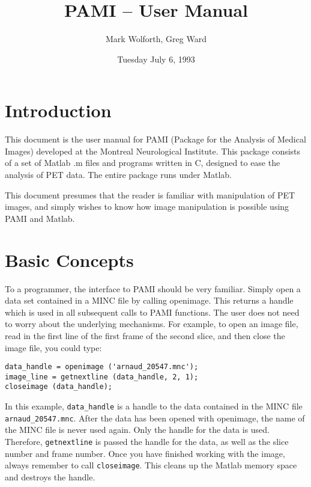 
\title{PAMI -- User Manual}
\author{Mark Wolforth, Greg Ward}
\date{Tuesday July 6, 1993}  

\def\code#1{{\tt #1}}

 

\maketitle
\newpage

\tableofcontents

\newpage
\section{Introduction}

This document is the user manual for PAMI (Package for the Analysis of Medical
Images) developed at the Montreal Neurological Institute.  This package consists
of a set of Matlab .m files and programs written in C, designed to ease the
analysis of PET data.  The entire package runs under Matlab.

This document presumes that the reader is familiar with manipulation of PET
images, and simply wishes to know how image manipulation is possible using
PAMI and Matlab.


\newpage
\section{Basic Concepts}

To a programmer, the interface to PAMI should be very familiar.  Simply open
a data set contained in a MINC file by calling openimage.  This returns a
handle which is used in all subsequent calls to PAMI functions.  The user does
not need to worry about the underlying mechanisms.  For example, to open
an image file, read in the first line of the first frame of the second slice,
and then close the image file, you could type:


\begin{verbatim}
data_handle = openimage ('arnaud_20547.mnc');
image_line = getnextline (data_handle, 2, 1);
closeimage (data_handle);
\end{verbatim}


In this example, \verb+data_handle+ is a handle to the data contained in the
MINC file \verb+arnaud_20547.mnc+.  After the data has been opened with
openimage, the name of the MINC file is never used again.  Only the handle for
the data is used.  Therefore, \verb+getnextline+ is passed the handle for the
data, as well as the slice number and frame number.  Once you have finished
working with the image, always remember to call \verb+closeimage+.  This
cleans up the Matlab memory space and destroys the handle.

